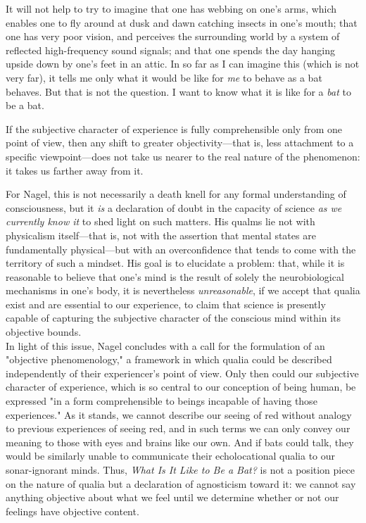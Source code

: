 \begin{displayquote}
    It will not help to try to imagine that one has webbing on one's arms, which enables one to fly around at dusk and dawn catching insects in one's mouth; that one has very poor vision, and perceives the surrounding world by a system of reflected high-frequency sound signals; and that one spends the day hanging upside down by one's feet in an attic. In so far as I can imagine this (which is not very far), it tells me only what it would be like for \textit{me} to behave as a bat behaves. But that is not the question. I want to know what it is like for a \textit{bat} to be a bat.
    \begin{center}
        \mydots
    \end{center}
    If the subjective character of experience is fully comprehensible only from one point of view, then any shift to greater objectivity---that is, less attachment to a specific viewpoint---does not take us nearer to the real nature of the phenomenon: it takes us farther away from it. \\
\end{displayquote}
        
For Nagel, this is not necessarily a death knell for any formal understanding of consciousness, but it \textit{is} a declaration of doubt in the capacity of science \textit{as we currently know it} to shed light on such matters. His qualms lie not with physicalism itself---that is, not with the assertion that mental states are fundamentally physical---but with an overconfidence that tends to come with the territory of such a mindset. His goal is to elucidate a problem: that, while it is reasonable to believe that one's mind is the result of solely the neurobiological mechanisms in one's body, it is nevertheless \textit{unreasonable}, if we accept that qualia exist and are essential to our experience, to claim that science is presently capable of capturing the subjective character of the conscious mind within its objective bounds. \\
        
In light of this issue, Nagel concludes with a call for the formulation of an "objective phenomenology," a framework in which qualia could be described independently of their experiencer's point of view. Only then could our subjective character of experience, which is so central to our conception of being human, be expressed "in a form comprehensible to beings incapable of having those experiences." As it stands, we cannot describe our seeing of red without analogy to previous experiences of seeing red, and in such terms we can only convey our meaning to those with eyes and brains like our own. And if bats could talk, they would be similarly unable to communicate their echolocational qualia to our sonar-ignorant minds. Thus, \textit{What Is It Like to Be a Bat?} is not a position piece on the nature of qualia but a declaration of agnosticism toward it: we cannot say anything objective about what we feel until we determine whether or not our feelings have objective content. \\
        

